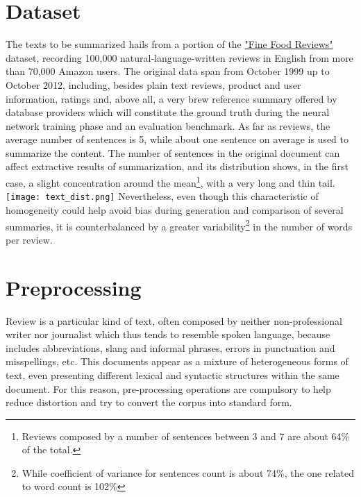 \documentclass[fleqn,10pt]{SelfArx} %
\affiliation{\textsuperscript{1}\textit{Universita` degli Studi di Milano Bicocca, CdLM in Data Science}}
\begin{document}
\flushbottom %

\maketitle %

\tableofcontents %

\thispagestyle{empty} %


\section{Dataset} 
The texts to be summarized hails from a portion of the \href{https://www.kaggle.com/snap/amazon-fine-food-reviews}{"Fine Food Reviews"} dataset, recording 100,000 natural-language-written reviews in English from more than 70,000 Amazon users. The original data span from October 1999 up to October 2012, including, besides plain text reviews, product and user information, ratings and, above all, a very brew reference summary offered by database providers which will constitute the ground truth during the neural network training phase and an evaluation benchmark. As far as reviews, the average number of sentences is 5, while about one sentence on average is used to summarize the content. The number of sentences in the original document can affect extractive results of summarization, and its distribution shows, in the first case, a slight concentration around the mean\footnote{Reviews composed by a number of sentences between 3 and 7 are about 64\% of the total.}, with a very long and thin tail.
\texttt{[image: text\_dist.png]}
Nevertheless, even though this characteristic of homogeneity could help avoid bias during generation and comparison of several summaries, it is counterbalanced by a greater variability\footnote{While coefficient of variance for sentences count is about 74\%, the one related to word count is 102\%} in the number of words per review.
\section{Preprocessing}
Review is a particular kind of text, often composed by neither non-professional writer nor journalist which thus tends to resemble spoken language, because includes abbreviations, slang and informal phrases, errors in punctuation and misspellings, etc. This documents appear as a mixture of heterogeneous forms of text, even presenting different lexical and syntactic structures within the same document. For this reason, pre-processing operations are compulsory to help reduce distortion and try to convert the corpus into standard form.
\end{document}

